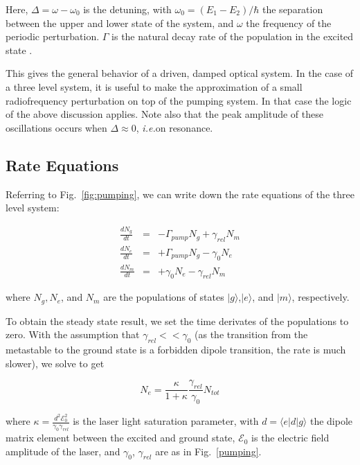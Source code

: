 Here, $\Delta = \omega - \omega_0$ is the detuning, with $\omega_0 =
(E_1 - E_2)/\hbar$ the separation between the upper and lower state of
the system, and $\omega$ the frequency of the periodic
perturbation. $\Gamma$ is the natural decay rate of the population in
the excited state \cite{budker}.

This gives the general behavior of a driven, damped optical system. In
the case of a three level system, it is useful to make the
approximation of a small radiofrequency perturbation on top of the pumping
system. In that case the logic of the above discussion applies. Note
also that the peak amplitude of these oscillations occurs when
$\Delta\approx0$, \emph{i.e.}on resonance.


\subsection{Rate Equations}\label{rateequations}

Referring to Fig.~\ref{fig:pumping}, we can write down the rate equations
of the three level system:

\begin{eqnarray}
\frac{dN_g}{dt} &=& -\Gamma_{pump}N_g + \gamma_{rel}N_m\\
\frac{dN_e}{dt} &=& +\Gamma_{pump}N_g - \gamma_{0}N_e\\
\frac{dN_m}{dt} &=& +\gamma_{0}N_e - \gamma_{rel}N_m
\end{eqnarray}

where $N_g, N_e$, and $N_m$ are the populations of states
$|g\rangle$,$|e\rangle$, and $|m\rangle$, respectively.

To obtain the steady state result, we set the time derivates of the
populations to zero. With the assumption that $\gamma_{rel}<<
\gamma_0$ (as the transition from the metastable to the ground state
is a forbidden dipole transition, the rate is much slower), we solve to get 

\begin{equation}
N_e = \frac{\kappa}{1+\kappa}\frac{\gamma_{rel}}{\gamma_{0}}N_{tot}
\end{equation}

where $\kappa = \frac{d^2\mathcal{E}_0^2}{\gamma_0\gamma_{rel}}$ is
the laser light saturation parameter, with $d = \langle e|d|g\rangle$
the dipole matrix element between the excited and ground state,
$\mathcal{E}_0$ is the electric field amplitude of the laser, and
$\gamma_0$, $\gamma_{rel}$ are as in Fig.~\ref{pumping}.

